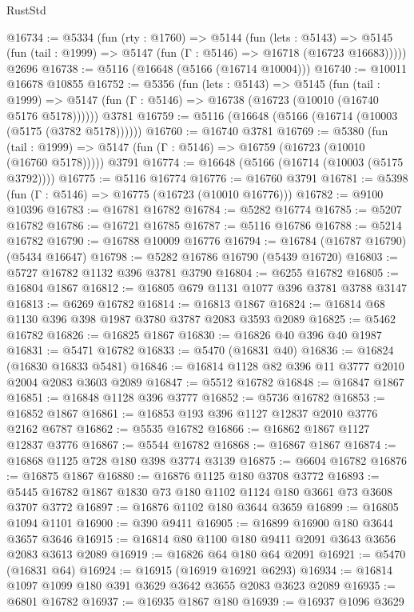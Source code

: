 \begin{lexlean}{RustStd}
\begin{coremodule}
@16734 := @5334
    (fun (rty : @1760) =>
    @5144
      (fun (lets : @5143) =>
      @5145 (fun (tail : @1999) => @5147 (fun (Γ : @5146) => @16718 (@16723 @16683)))))
    @2696
@16738 := @5116 (@16648 (@5166 (@16714 @10004)))
@16740 := @10011 @16678 @10855
@16752 := @5356
    (fun (lets : @5143) =>
    @5145
      (fun (tail : @1999) =>
      @5147 (fun (Γ : @5146) => @16738 (@16723 (@10010 (@16740 @5176 @5178))))))
    @3781
@16759 := @5116 (@16648 (@5166 (@16714 (@10003 (@5175 (@3782 @5178))))))
@16760 := @16740 @3781
@16769 := @5380
    (fun (tail : @1999) => @5147 (fun (Γ : @5146) => @16759 (@16723 (@10010 (@16760 @5178)))))
    @3791
@16774 := @16648 (@5166 (@16714 (@10003 (@5175 @3792))))
@16775 := @5116 @16774
@16776 := @16760 @3791
@16781 := @5398 (fun (Γ : @5146) => @16775 (@16723 (@10010 @16776)))
@16782 := @9100 @10396
@16783 := @16781 @16782
@16784 := @5282 @16774
@16785 := @5207 @16782
@16786 := @16721 @16785
@16787 := @5116 @16786
@16788 := @5214 @16782
@16790 := @16788 @10009 @16776
@16794 := @16784 (@16787 @16790) (@5434 @16647)
@16798 := @5282 @16786 @16790 (@5439 @16720)
@16803 := @5727 @16782 @1132 @396 @3781 @3790
@16804 := @6255 @16782
@16805 := @16804 @1867
@16812 := @16805 @679 @1131 @1077 @396 @3781 @3788 @3147
@16813 := @6269 @16782
@16814 := @16813 @1867
@16824 := @16814 @68 @1130 @396 @398 @1987 @3780 @3787 @2083 @3593 @2089
@16825 := @5462 @16782
@16826 := @16825 @1867
@16830 := @16826 @40 @396 @40 @1987
@16831 := @5471 @16782
@16833 := @5470 (@16831 @40)
@16836 := @16824 (@16830 @16833 @5481)
@16846 := @16814 @1128 @82 @396 @11 @3777 @2010 @2004 @2083 @3603 @2089
@16847 := @5512 @16782
@16848 := @16847 @1867
@16851 := @16848 @1128 @396 @3777
@16852 := @5736 @16782
@16853 := @16852 @1867
@16861 := @16853 @193 @396 @1127 @12837 @2010 @3776 @2162 @6787
@16862 := @5535 @16782
@16866 := @16862 @1867 @1127 @12837 @3776
@16867 := @5544 @16782
@16868 := @16867 @1867
@16874 := @16868 @1125 @728 @180 @398 @3774 @3139
@16875 := @6604 @16782
@16876 := @16875 @1867
@16880 := @16876 @1125 @180 @3708 @3772
@16893 := @5445 @16782 @1867 @1830 @73 @180 @1102 @1124 @180 @3661 @73 @3608 @3707 @3772
@16897 := @16876 @1102 @180 @3644 @3659
@16899 := @16805 @1094 @1101
@16900 := @390 @9411
@16905 := @16899 @16900 @180 @3644 @3657 @3646
@16915 := @16814 @80 @1100 @180 @9411 @2091 @3643 @3656 @2083 @3613 @2089
@16919 := @16826 @64 @180 @64 @2091
@16921 := @5470 (@16831 @64)
@16924 := @16915 (@16919 @16921 @6293)
@16934 := @16814 @1097 @1099 @180 @391 @3629 @3642 @3655 @2083 @3623 @2089
@16935 := @6801 @16782
@16937 := @16935 @1867 @180
@16939 := @16937 @1096 @3629

\end{coremodule}
\end{lexlean}

